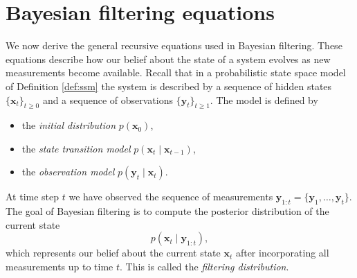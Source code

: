 

\section{Bayesian filtering equations}
We now derive the general recursive equations used in Bayesian filtering. These equations describe how our belief about the state of a system evolves as new measurements become available. Recall that in a probabilistic state space model of Definition \ref{def:ssm} the system is described by a sequence of hidden states $\{\mathbf{x}_t\}_{t \geq 0}$ and a sequence of observations $\{\mathbf{y}_t\}_{t \geq 1}$. The model is defined by 

\begin{itemize}
    \item the \textit{initial distribution} $p(\mathbf{x}_0)$,
    \item the \textit{state transition model} $p(\mathbf{x}_t \mid \mathbf{x}_{t-1})$,
    \item the \textit{observation model} $p(\mathbf{y}_t \mid \mathbf{x}_t)$.
\end{itemize}
At time step $t$ we have observed the sequence of measurements $\mathbf{y}_{1:t} = \{\mathbf{y}_1, \dots, \mathbf{y}_t\}$.
The goal of Bayesian filtering is to compute the posterior distribution of the current state
\[
p(\mathbf{x}_t \mid \mathbf{y}_{1:t}),
\]
which represents our belief about the current state $\mathbf{x}_t$ after incorporating all measurements up to time $t$. This is called the \emph{filtering distribution}. 

